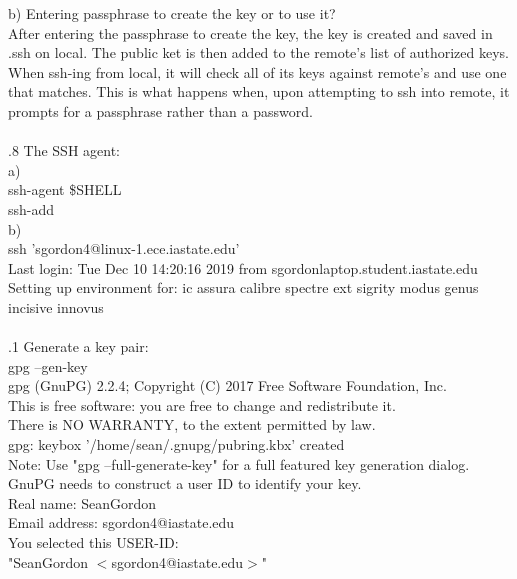 \documentclass[12pt]{article}
\begin{document}
b) Entering passphrase to create the key or to use it?\\
After entering the passphrase to create the key, the key is created and saved in .ssh on local. The public ket is then added to the remote's list of authorized keys. When ssh-ing from local, it will check all of its keys against remote's and use one that matches. This is what happens when, upon attempting to ssh into remote, it prompts for a passphrase rather than a password.\\

\hrulefill\\

.8 The SSH agent:\\

a) \\
ssh-agent \$SHELL\\
ssh-add\\

b) \\
ssh 'sgordon4@linux-1.ece.iastate.edu'\\
Last login: Tue Dec 10 14:20:16 2019 from sgordonlaptop.student.iastate.edu\\
Setting up environment for: ic assura calibre spectre ext sigrity modus genus incisive innovus\\

\hrulefill\\

.1 Generate a key pair:\\

\noindent gpg --gen-key\\
gpg (GnuPG) 2.2.4; Copyright (C) 2017 Free Software Foundation, Inc.\\
This is free software: you are free to change and redistribute it.\\
There is NO WARRANTY, to the extent permitted by law.\\

\noindent gpg: keybox '/home/sean/.gnupg/pubring.kbx' created\\
Note: Use "gpg --full-generate-key" for a full featured key generation dialog.\\

\noindent GnuPG needs to construct a user ID to identify your key.\\

\noindent Real name: SeanGordon\\
Email address: sgordon4@iastate.edu\\
You selected this USER-ID:\\
\indent "SeanGordon $<$sgordon4@iastate.edu$>$"\\
\end{document}
